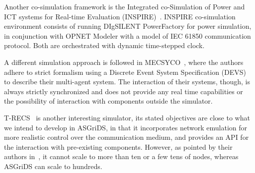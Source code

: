 \documentclass[conference]{IEEEtran}
\begin{document}
Another co-simulation framework is the Integrated co-Simulation of Power and ICT systems for Real-time Evaluation (INSPIRE)~\cite{georgINSPIREIntegratedCosimulation2013}. INSPIRE co-simulation environment consists of running DIgSILENT PowerFactory for power simulation, in conjunction with OPNET Modeler with a model of IEC 61850 communication protocol. Both are orchestrated with dynamic time-stepped clock.


A different simulation approach is followed in MECSYCO~\cite{vaubourgMultiagentMultiModelSimulation2015}, where the authors adhere to strict formalism using a Discrete Event System Specification (DEVS) to describe their multi-agent system. The interaction of their systems, though, is always strictly synchronized and does not provide any real time capabilities or the possibility of interaction with components outside the simulator.

T-RECS~\cite{acharaTRECSVirtualCommissioning2018} is another interesting simulator, its stated objectives are close to what we intend to develop in ASGriDS, in that it incorporates network emulation for more realistic control over the communication medium, and provides an API for the interaction with pre-existing components. However, as pointed by their authors in~\cite{acharaTRECSVirtualCommissioning2018}, it cannot scale to more than ten or a few tens of nodes, whereas ASGriDS can scale to hundreds. 
\end{document}
